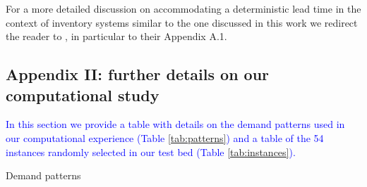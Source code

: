\documentclass{tPRS2e}
\newcommand{\blue}{\textcolor{blue}}
\begin{document}
For a more detailed discussion on accommodating a deterministic lead time in the context of inventory systems similar to the one discussed in this work we redirect the reader to \cite{citeulike:7288002}, in particular to their Appendix A.1.

\subsection*{Appendix II: further details on our computational study}
\label{sec:appendix_II}

\blue{In this section we provide a table with details on the demand patterns used in our computational experience (Table \ref{tab:patterns}) and a table of the 54 instances randomly selected in our test bed (Table \ref{tab:instances}).}

\begin{table}[h]
	\centering
	\caption{Demand patterns}
	\label{tab:patterns}
\resizebox{0.9\columnwidth}{!}{


}
\end{table}
\end{document}
